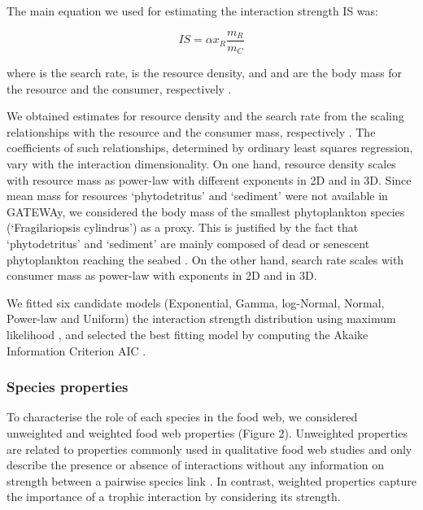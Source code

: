 \documentclass[gc, manuscript]{copernicus}
\begin{document}
The main equation we used for estimating the interaction strength IS
was:

\begin{equation}
IS = \alpha x_R \frac{m_R}{m_C}
\end{equation}

where \vec{\alpha} is the search rate,  is the resource
density, and  and  are the body mass for the resource
and the consumer, respectively \citep{Pawar2012}.

We obtained estimates for resource density and the search rate from the
scaling relationships with the resource and the consumer mass,
respectively \citep{Pawar2012}. The coefficients of such relationships,
determined by ordinary least squares regression, vary with the
interaction dimensionality. On one hand, resource density scales with
resource mass as power-law with different exponents in 2D and in 3D.
Since mean mass for resources `phytodetritus' and `sediment' were not
available in GATEWAy, we considered the body mass of the smallest
phytoplankton species (`Fragilariopsis cylindrus') as a proxy. This is
justified by the fact that `phytodetritus' and `sediment' are mainly
composed of dead or senescent phytoplankton reaching the seabed
\citep{Wolanski2011}. On the other hand, search rate scales with
consumer mass as power-law with exponents in 2D and in 3D.

We fitted six candidate models (Exponential, Gamma, log-Normal, Normal,
Power-law and Uniform) the interaction strength distribution using
maximum likelihood \citep{McCallum2008}, and selected the best fitting
model by computing the Akaike Information Criterion AIC
\citep{Burnham2002}.

\subsubsection{Species properties}

To characterise the role of each species in the food web, we considered
unweighted and weighted food web properties (Figure 2). Unweighted
properties are related to properties commonly used in qualitative food
web studies and only describe the presence or absence of interactions
without any information on strength between a pairwise species link
\citep{Martinez1991, Dunne2002, Borrelli2014}. In contrast, weighted
properties capture the importance of a trophic interaction by
considering its strength.
\end{document}
